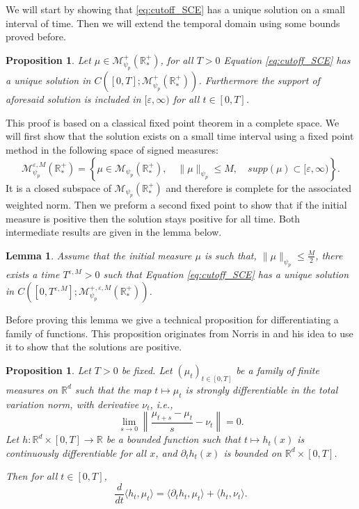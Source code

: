 \documentclass[11pt,a4paper]{article}
\newcommand{\RRP}{\mathbb{R}^+_*}
\newcommand{\MC}{\mathcal{M}}
\newtheorem{lemma}[theorem]{Lemma}
\newtheorem{proposition}[theorem]{Proposition}
\begin{document}
We will start by showing that \eqref{eq:cutoff_SCE} has a unique solution on a small interval of time. Then we will extend the temporal domain using some  bounds proved before.
\begin{proposition}\label{prop:well-posedness-cutoff-smol}
    Let $\mu \in \MC^+_{\psi_p}(\RRP)$, for all $T > 0$ Equation \eqref{eq:cutoff_SCE} has a unique solution in $C\left([0,T];\MC^+_{\psi_p}(\RRP)\right)$. Furthermore the support of aforesaid solution is included in $[\varepsilon,\infty)$ for all $t \in [0,T]$.
\end{proposition}

This proof is based on a classical fixed point theorem in a complete space. We will first show that the solution exists on a small time interval using a fixed point method in the following space of signed measures:
    \[ \MC^{\varepsilon,M}_{\psi_p}(\RRP) = \left\lbrace \mu \in \MC_{\psi_p}(\RRP) ,\quad \|\mu \|_{\psi_p}\leq M,\quad supp(\mu) \subset [\varepsilon,\infty)\right\rbrace. \]
It is a closed subspace of $\MC_{\psi_p}(\RRP)$ and therefore is complete for the associated weighted norm. Then we preform a second fixed point to show that if the initial measure is positive then the solution stays positive for all time. Both intermediate results are given in the lemma below. 
\begin{lemma}\label{lem:fixed-point-1}
    Assume that the initial measure $\mu$ is such that, $\| \mu\|_{\psi_p} \leq \frac{M}{2}$, there exists a time $T^{\varepsilon,M} > 0$ such that Equation \eqref{eq:cutoff_SCE} has a unique solution in $C\left([0,T^{\varepsilon,M}];\MC^{+,\varepsilon,M}_{\psi_p}(\RRP)\right)$. 
\end{lemma}
Before proving this lemma we give a technical proposition for differentiating a family of functions. This proposition originates from Norris in \cite{norrisSmoluchowskisCoagulationEquation1999} and his idea to use it to show that the solutions are positive.
\begin{proposition}
    Let $T > 0$ be fixed. Let $\left(\mu_t \right)_{t \in [0,T]}$ be a family of finite measures on $\mathbb{R}^d$ such that the map $t \mapsto \mu_t$ is strongly differentiable in the total variation norm, with derivative $\nu_t$, i.e.,
    \[
    \lim_{s \to 0} \left\| \frac{\mu_{t+s} - \mu_t}{s} - \nu_t \right\| = 0.
    \]
    Let $h : \mathbb{R}^d \times [0,T] \to \mathbb{R}$ be a bounded function such that $t \mapsto h_t(x)$ is continuously differentiable for all $x$, and $\partial_t h_t(x)$ is bounded on $\mathbb{R}^d \times [0,T]$.
    
    Then for all $t \in [0,T]$,
    \[
    \frac{d}{dt} \langle h_t, \mu_t \rangle = \langle \partial_t h_t, \mu_t \rangle + \langle h_t, \nu_t \rangle.
    \]
    \end{proposition}
    
\end{document}
